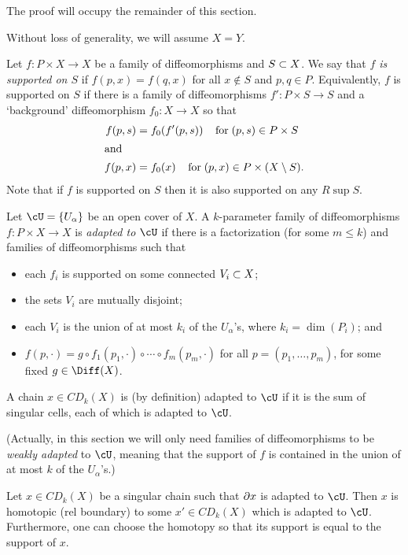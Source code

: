 \medskip

The proof will occupy the remainder of this section.

Without loss of generality, we will assume $X = Y$.

\medskip

Let $f: P \times X \to X$ be a family of diffeomorphisms and $S \subset X$.
We say that {\it $f$ is supported on $S$} if $f(p, x) = f(q, x)$ for all
$x \notin S$ and $p, q \in P$. Equivalently, $f$ is supported on $S$ if there is a family of diffeomorphisms $f' : P \times S \to S$ and a `background'
diffeomorphism $f_0 : X \to X$ so that
\begin{align}
	f(p,s) & = f_0(f'(p,s)) \;\;\;\; \mbox{for}\; (p, s) \in P\times S \\
\intertext{and}
	f(p,x) & = f_0(x) \;\;\;\; \mbox{for}\; (p, x) \in {P \times (X \setminus S)}.
\end{align}
Note that if $f$ is supported on $S$ then it is also supported on any $R \sup S$.

Let $\cU = \{U_\alpha\}$ be an open cover of $X$.
A $k$-parameter family of diffeomorphisms $f: P \times X \to X$ is
{\it adapted to $\cU$} if there is a factorization
(for some $m \le k$)
and families of diffeomorphisms
such that
\begin{itemize}
\item each $f_i$ is supported on some connected $V_i \subset X$;
\item the sets $V_i$ are mutually disjoint;
\item each $V_i$ is the union of at most $k_i$ of the $U_\alpha$'s,
where $k_i = \dim(P_i)$; and
\item $f(p, \cdot) = g \circ f_1(p_1, \cdot) \circ \cdots \circ f_m(p_m, \cdot)$
for all $p = (p_1, \ldots, p_m)$, for some fixed $g \in \Diff(X)$.
\end{itemize}
A chain $x \in CD_k(X)$ is (by definition) adapted to $\cU$ if it is the sum
of singular cells, each of which is adapted to $\cU$.

(Actually, in this section we will only need families of diffeomorphisms to be 
{\it weakly adapted} to $\cU$, meaning that the support of $f$ is contained in the union
of at most $k$ of the $U_\alpha$'s.)

\begin{lemma}  \label{extension_lemma}
Let $x \in CD_k(X)$ be a singular chain such that $\partial x$ is adapted to $\cU$.
Then $x$ is homotopic (rel boundary) to some $x' \in CD_k(X)$ which is adapted to $\cU$.
Furthermore, one can choose the homotopy so that its support is equal to the support of $x$.
\end{lemma}

